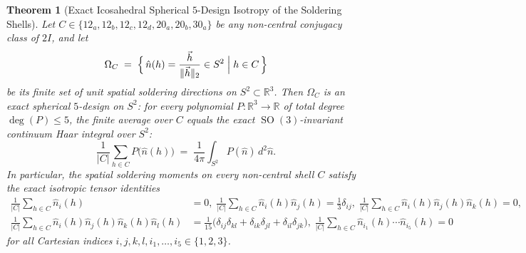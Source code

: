 \documentclass[11pt,a4paper]{article}
\newtheorem{theorem}{Theorem}[section]
\theoremstyle{definition}
\theoremstyle{remark}
\newcommand{\R}{\mathbb{R}}
\newcommand{\SO}{\operatorname{SO}}
\begin{document}
\begin{theorem}[Exact Icosahedral Spherical $5$-Design Isotropy of the Soldering Shells]
\label{thm:spherical_5design}
Let $C \in \{12_a, 12_b, 12_c, 12_d, 20_a, 20_b, 30_a\}$ be any non-central conjugacy class of $2I$, and let
\begin{equation}
\label{eq:shell_directions}
\Omega_C \;=\; \Bigl\{\, \hat{n}(h) = \frac{\vec{h}}{\|\vec{h}\|_2} \in S^2 \;\Big|\; h \in C \,\Bigr\}
\end{equation}
be its finite set of unit spatial soldering directions on $S^2 \subset \R^3$. Then $\Omega_C$ is an exact \emph{spherical $5$-design} on $S^2$: for every polynomial $P : \R^3 \to \R$ of total degree $\deg(P) \le 5$, the finite average over $C$ equals the exact $\SO(3)$-invariant continuum Haar integral over $S^2$:
\begin{equation}
\label{eq:5design_equality}
\frac{1}{|C|} \sum_{h \in C} P\bigl(\hat{n}(h)\bigr) \;=\; \frac{1}{4\pi} \int_{S^2} P(\hat{n})\,d^2\hat{n}.
\end{equation}
In particular, the spatial soldering moments on every non-central shell $C$ satisfy the exact isotropic tensor identities
\begin{align}
\frac{1}{|C|}\sum_{h\in C} \hat{n}_i(h) &= 0, \;
\frac{1}{|C|}\sum_{h\in C} \hat{n}_i(h)\hat{n}_j(h) = \frac{1}{3}\delta_{ij}, \;
\frac{1}{|C|}\sum_{h\in C} \hat{n}_i(h)\hat{n}_j(h)\hat{n}_k(h) = 0, \label{eq:moments_123} \\
\frac{1}{|C|}\sum_{h\in C} \hat{n}_i(h)\hat{n}_j(h)\hat{n}_k(h)\hat{n}_l(h) &= \frac{1}{15}\bigl(\delta_{ij}\delta_{kl} + \delta_{ik}\delta_{jl} + \delta_{il}\delta_{jk}\bigr), \;
\frac{1}{|C|}\sum_{h\in C} \hat{n}_{i_1}(h)\cdots\hat{n}_{i_5}(h) = 0 \label{eq:moments_45}
\end{align}
for all Cartesian indices $i, j, k, l, i_1, \dots, i_5 \in \{1, 2, 3\}$.
\end{theorem}
\end{document}
